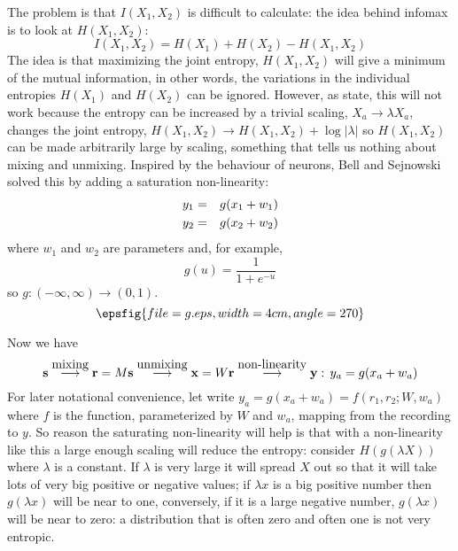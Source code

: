 \documentclass[12pt]{article}
\begin{document}
The problem is that $I(X_1,X_2)$ is difficult to calculate: the idea behind infomax is to look at $H(X_1,X_2)$:
\begin{equation}
I(X_1,X_2)=H(X_1)+H(X_2)-H(X_1,X_2)
\end{equation}
The idea is that maximizing the joint entropy, $H(X_1,X_2)$ will give
a minimum of the mutual information, in other words, the variations in
the individual entropies $H(X_1)$ and $H(X_2)$ can be
ignored. However, as state, this will not work because the entropy can
be increased by a trivial scaling, $X_a\rightarrow \lambda X_a$,
changes the joint entropy, $H(X_1,X_2)\rightarrow
H(X_1,X_2)+\log{|\lambda|}$ so $H(X_1,X_2)$ can be made arbitrarily
  large by scaling, something that tells us nothing about mixing and
  unmixing. Inspired by the behaviour of neurons, Bell and Sejnowski
  solved this by adding a saturation non-linearity: 
\begin{eqnarray}
y_1&=&g(x_1+w_1)\cr
y_2&=&g(x_2+w_2)
\end{eqnarray}
where $w_1$ and $w_2$ are parameters and, for example,
\begin{equation}
g(u)=\frac{1}{1+e^{-u}}
\end{equation}
so $g:(-\infty,\infty)\rightarrow (0,1)$.
\begin{equation}
\epsfig{file=g.eps,width=4cm,angle=270}
\end{equation}

Now we have
\begin{equation}
{\bf s}\stackrel{\mbox{mixing}}{\longrightarrow}{\bf r}=M{\bf s}\stackrel{\mbox{unmixing}}{\longrightarrow}{\bf x}=W{\bf r}\stackrel{\mbox{non-linearity}}{\longrightarrow}{\bf y}:\,y_a=g(x_a+w_a)
\end{equation}
For later notational convenience, let write
$y_a=g(x_a+w_a)=f(r_1,r_2;W,w_a)$ where $f$ is the function,
parameterized by $W$ and $w_a$, mapping from the recording to $y$. So
reason the saturating non-linearity will help is that with a
non-linearity like this a large enough scaling will reduce the
entropy: consider $H(g(\lambda X))$ where $\lambda$ is a constant. If
$\lambda$ is very large it will spread $X$ out so that it will take
lots of very big positive or negative values; if $\lambda x$ is a big
positive number then $g(\lambda x)$ will be near to one, conversely,
if it is a large negative number, $g(\lambda x)$ will be near to zero:
a distribution that is often zero and often one is not very entropic.
\end{document}
